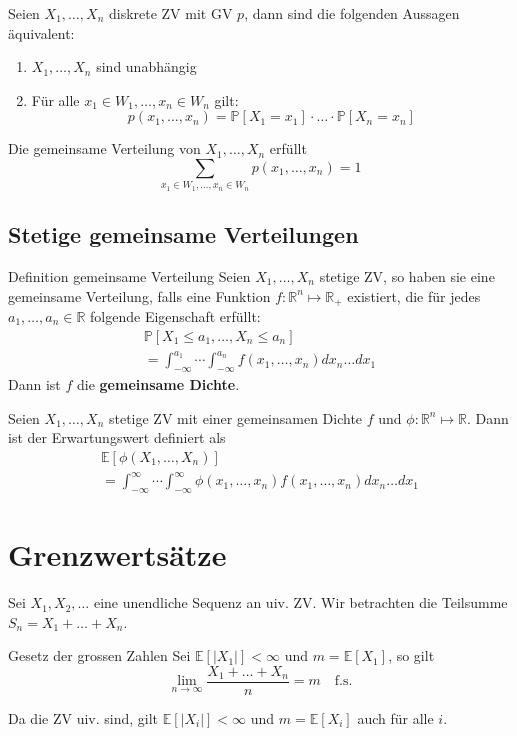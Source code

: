 \documentclass[a4paper,10pt]{article}
\def\R{\mathbb{R}}
\def\P{\mathbb{P}}
\def\E{\mathbb{E}}
\begin{document}
Seien \(X_1,\ldots,X_n\) diskrete ZV mit GV \(p\), dann sind die folgenden Aussagen äquivalent:
\begin{enumerate}
    \item \(X_1,\ldots,X_n\) sind unabhängig
    \item Für alle \(x_1 \in W_1, \ldots, x_n \in W_n\) gilt:
          \[p(x_1,\ldots,x_n) = \P[X_1 = x_1] \cdot \ldots \cdot \P[X_n = x_n]\]
\end{enumerate}

Die gemeinsame Verteilung von \(X_1, \ldots, X_n\) erfüllt
\[\sum_{x_1\in W_1, \ldots, x_n \in W_n} p(x_1, \ldots, x_n) = 1\]

\subsection{Stetige gemeinsame Verteilungen}
\begin{subbox}{Definition gemeinsame Verteilung}
    Seien \(X_1, \ldots, X_n\) stetige ZV, so haben sie eine gemeinsame Verteilung, falls eine Funktion \(f: \R^n \mapsto \R_+\) existiert, die für jedes \(a_1, \ldots, a_n \in \R\) folgende Eigenschaft erfüllt:
    \begin{align*}
        \P[X_1 \le a_1, \ldots, X_n \le a_n] \\= \int_{-\infty}^{a_1} \cdots \int_{-\infty}^{a_n} f(x_1, \ldots, x_n) dx_n \ldots dx_1
    \end{align*}
    Dann ist \(f\) die \textbf{gemeinsame Dichte}.
\end{subbox}

Seien \(X_1, \ldots, X_n\) stetige ZV mit einer gemeinsamen Dichte \(f\) und \(\phi: \R^n \mapsto \R\). Dann ist der Erwartungswert definiert als
\begin{align*}
    \E[\phi(X_1, \ldots, X_n)] \\= \int_{-\infty}^\infty \cdots \int_{-\infty}^\infty \phi(x_1, \ldots, x_n) f(x_1, \ldots, x_n) dx_n \ldots dx_1
\end{align*}


\section{Grenzwertsätze}
Sei \(X_1, X_2, \ldots\) eine unendliche Sequenz an uiv. ZV. Wir betrachten die Teilsumme \(S_n = X_1 + \ldots + X_n\).
\begin{mainbox}{Gesetz der grossen Zahlen}
    Sei \(\E[|X_1|] < \infty\) und \(m = \E[X_1]\), so gilt
    \[\lim_{n\to \infty} \frac{X_1 + \ldots + X_n}{n} = m \quad \text{f.s.}\]
\end{mainbox}
Da die ZV uiv. sind, gilt \(\E[|X_i|] < \infty\) und \(m = \E[X_i]\) auch für alle \(i\).
\end{document}
